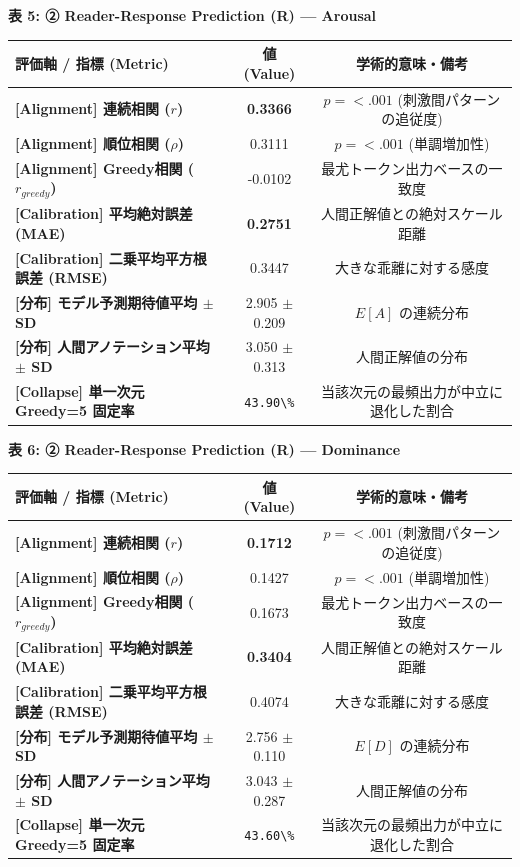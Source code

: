 \textbf{表 5: ② Reader-Response Prediction (R) — Arousal}
\begin{center}
\small
\begin{tabular}{lcc}
\toprule
\textbf{評価軸 / 指標 (Metric)} & \textbf{値 (Value)} & \textbf{学術的意味・備考} \\
\midrule
\textbf{[Alignment] 連続相関 ($r$)} & \textbf{0.3366} & $p = <.001 $ (刺激間パターンの追従度) \\
\textbf{[Alignment] 順位相関 ($\rho$)} & 0.3111 & $p = <.001 $ (単調増加性) \\
\textbf{[Alignment] Greedy相関 ($r_{greedy}$)} & -0.0102 & 最尤トークン出力ベースの一致度 \\
\textbf{[Calibration] 平均絶対誤差 (MAE)} & \textbf{0.2751} & 人間正解値との絶対スケール距離 \\
\textbf{[Calibration] 二乗平均平方根誤差 (RMSE)} & 0.3447 & 大きな乖離に対する感度 \\
\textbf{[分布] モデル予測期待値平均 $\pm$ SD} & 2.905 $\pm$ 0.209 & $E[A]$ の連続分布 \\
\textbf{[分布] 人間アノテーション平均 $\pm$ SD} & 3.050 $\pm$ 0.313 & 人間正解値の分布 \\
\textbf{[Collapse] 単一次元 Greedy=5 固定率} & \texttt{43.90\textbackslash{}\%} & 当該次元の最頻出力が中立に退化した割合 \\
\bottomrule
\end{tabular}
\end{center}


\textbf{表 6: ② Reader-Response Prediction (R) — Dominance}
\begin{center}
\small
\begin{tabular}{lcc}
\toprule
\textbf{評価軸 / 指標 (Metric)} & \textbf{値 (Value)} & \textbf{学術的意味・備考} \\
\midrule
\textbf{[Alignment] 連続相関 ($r$)} & \textbf{0.1712} & $p = <.001 $ (刺激間パターンの追従度) \\
\textbf{[Alignment] 順位相関 ($\rho$)} & 0.1427 & $p = <.001 $ (単調増加性) \\
\textbf{[Alignment] Greedy相関 ($r_{greedy}$)} & 0.1673 & 最尤トークン出力ベースの一致度 \\
\textbf{[Calibration] 平均絶対誤差 (MAE)} & \textbf{0.3404} & 人間正解値との絶対スケール距離 \\
\textbf{[Calibration] 二乗平均平方根誤差 (RMSE)} & 0.4074 & 大きな乖離に対する感度 \\
\textbf{[分布] モデル予測期待値平均 $\pm$ SD} & 2.756 $\pm$ 0.110 & $E[D]$ の連続分布 \\
\textbf{[分布] 人間アノテーション平均 $\pm$ SD} & 3.043 $\pm$ 0.287 & 人間正解値の分布 \\
\textbf{[Collapse] 単一次元 Greedy=5 固定率} & \texttt{43.60\textbackslash{}\%} & 当該次元の最頻出力が中立に退化した割合 \\
\bottomrule
\end{tabular}
\end{center}


